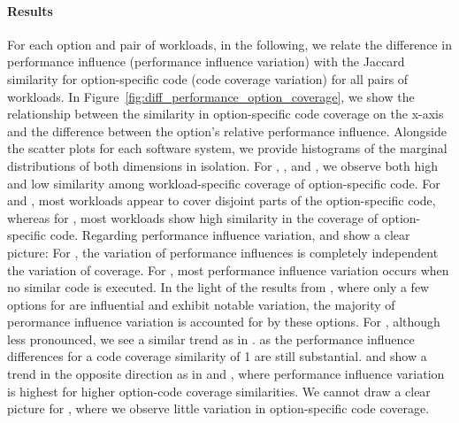 \paragraph*{Results}
For each option and pair of workloads, in the following, we relate the difference in performance influence (performance influence variation) with the Jaccard similarity for option-specific code (code coverage variation) for all pairs of workloads.
In Figure~\ref{fig:diff_performance_option_coverage}, we show the relationship between the similarity in option-specific code coverage on the x-axis and the difference between the option's relative performance influence. Alongside the scatter plots for each software system, we provide histograms of the marginal distributions of both dimensions in isolation. 
For \batik, \dconvert, and \jumper, we observe both high and low similarity among workload-specific coverage of option-specific code. For \htwo and \jadx, most workloads appear to cover disjoint parts of the option-specific code, whereas for \kanzi, most workloads show high similarity in the coverage of option-specific code. 
Regarding performance influence variation, \dconvert and \jadx show a clear picture: For \dconvert, the variation of performance influences is completely independent the variation of coverage. For \jadx, most performance influence variation occurs when no similar code is executed. In the light of the results from , where only a few options for \jadx are influential and exhibit notable variation, the majority of perormance influence variation is accounted for by these options. 
For \jumper, although less pronounced, we see a similar trend as in \jadx. as the performance influence differences for a code coverage similarity of 1 are still substantial. 
\htwo and \batik show a trend in the opposite direction as in \jadx and \jumper, where performance influence variation is highest for higher option-code coverage similarities. We cannot draw a clear picture for \kanzi, where we observe little variation in option-specific code coverage.
